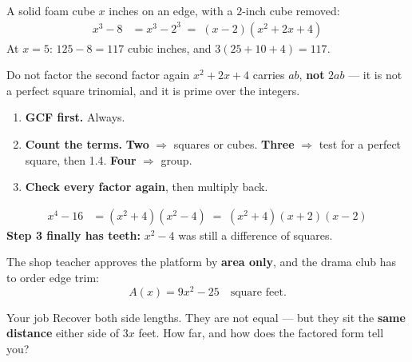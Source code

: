 \documentclass[aspectratio=169, 11pt]{beamer}
\begin{document}
\begin{frame}[t, plain]
  A solid foam cube $x$ inches on an edge, with a $2$-inch cube removed:
  \[
  \begin{aligned}
    x^3-8 &= x^3-2^3 \;=\; (x-2)\left(x^2+2x+4\right)
  \end{aligned}
  \]
  At $x=5$: \; $125-8 = 117$ cubic inches, \; and \; $3(25+10+4) = 117$. \quad\checkmark
  \begin{block}{Do not factor the second factor again}
    $x^2+2x+4$ carries $ab$, \textbf{not} $2ab$ --- it is not a perfect square trinomial, and it is
    prime over the integers.
  \end{block}
\end{frame}

\begin{frame}[t, plain]
  \begin{enumerate}
    \setlength{\itemsep}{0.15cm}
    \item \textbf{GCF first.} Always.
    \item \textbf{Count the terms.} \textbf{Two} $\Rightarrow$ squares or cubes. \textbf{Three}
          $\Rightarrow$ test for a perfect square, then 1.4. \textbf{Four} $\Rightarrow$ group.
    \item \textbf{Check every factor again}, then multiply back.
  \end{enumerate}
  \vspace{0.15cm}
  \[
  \begin{aligned}
    x^4-16 &= \left(x^2+4\right)\left(x^2-4\right)
            \;=\; \left(x^2+4\right)(x+2)(x-2)
  \end{aligned}
  \]
  {\color{goldacc}\bfseries Step 3 finally has teeth:} $x^2-4$ was still a difference of squares.
\end{frame}

\begin{frame}[t, plain]
  The shop teacher approves the platform by \textbf{area only}, and the drama club has to order
  edge trim:
  \[ A(x) = 9x^2-25 \quad \text{square feet.} \]
  \begin{block}{Your job}
    Recover both side lengths. They are not equal --- but they sit the \textbf{same distance}
    either side of $3x$ feet. How far, and how does the factored form tell you?
  \end{block}
\end{frame}
\end{document}
